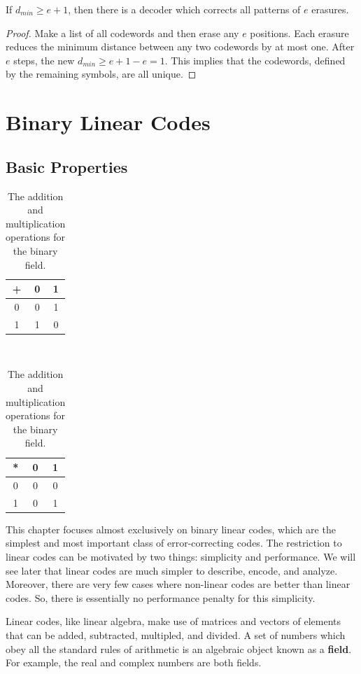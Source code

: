 \begin{proposition}
If $d_{min}\geq e+1$, then there is a decoder which corrects all patterns of $e$ erasures.
\end{proposition}
\begin{proof}
Make a list of all codewords and then erase any $e$ positions.
Each erasure reduces the minimum distance between any two codewords by at most one.
After $e$ steps, the new $d_{min}\geq e+1-e=1$.
This implies that the codewords, defined by the remaining symbols, are all unique.
\end{proof}

\section{Binary Linear Codes}


\subsection{Basic Properties}

\begin{table}
\begin{center}
\begin{tabular}{c||c|c}
+ & 0 & 1\tabularnewline
\hline
\hline
0 & 0 & 1\tabularnewline
\hline 
1 & 1 & 0\tabularnewline
\end{tabular}~~~\begin{tabular}{c||c|c}
{*} & 0 & 1\tabularnewline
\hline
\hline
0 & 0 & 0\tabularnewline
\hline 
1 & 0 & 1\tabularnewline
\end{tabular}
\caption{The addition and multiplication operations for the binary field.}
\label{tab:BinaryField}
\end{center}
\end{table}

This chapter focuses almost exclusively on binary linear codes, which are the simplest and most important class of error-correcting codes.
The restriction to linear codes can be motivated by two things: simplicity and performance.
We will see later that linear codes are much simpler to describe, encode, and analyze.
Moreover, there are very few cases where non-linear codes are better than linear codes.
So, there is essentially no performance penalty for this simplicity.

Linear codes, like linear algebra, make use of matrices and vectors of elements that can be added, subtracted, multipled, and divided.
A set of numbers which obey all the standard rules of arithmetic is an algebraic object known as a \textbf{field}.
For example, the real and complex numbers are both fields.

